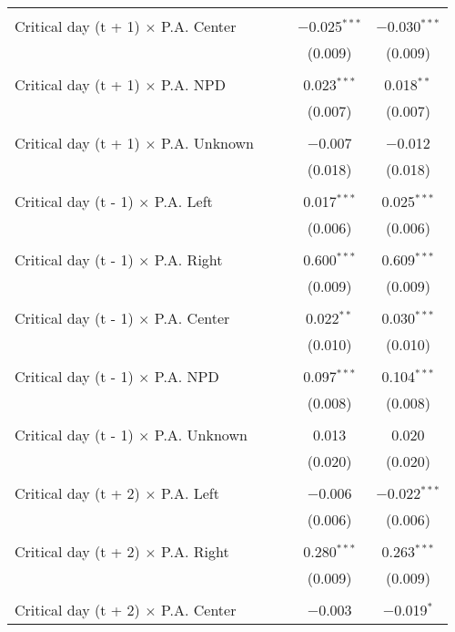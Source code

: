 \documentclass[
]{article}
\begin{document}
\begin{table}[!htbp]
{\begin{tabular}{@{\extracolsep{5pt}}lcccc}
  & & & & \\ 
 Critical day (t + 1) $\times$ P.A. Center &  &  & $-$0.025$^{***}$ & $-$0.030$^{***}$ \\ 
  &  &  & (0.009) & (0.009) \\ 
  & & & & \\ 
 Critical day (t + 1) $\times$ P.A. NPD &  &  & 0.023$^{***}$ & 0.018$^{**}$ \\ 
  &  &  & (0.007) & (0.007) \\ 
  & & & & \\ 
 Critical day (t + 1) $\times$ P.A. Unknown &  &  & $-$0.007 & $-$0.012 \\ 
  &  &  & (0.018) & (0.018) \\ 
  & & & & \\ 
 Critical day (t - 1) $\times$ P.A. Left &  &  & 0.017$^{***}$ & 0.025$^{***}$ \\ 
  &  &  & (0.006) & (0.006) \\ 
  & & & & \\ 
 Critical day (t - 1) $\times$ P.A. Right &  &  & 0.600$^{***}$ & 0.609$^{***}$ \\ 
  &  &  & (0.009) & (0.009) \\ 
  & & & & \\ 
 Critical day (t - 1) $\times$ P.A. Center &  &  & 0.022$^{**}$ & 0.030$^{***}$ \\ 
  &  &  & (0.010) & (0.010) \\ 
  & & & & \\ 
 Critical day (t - 1) $\times$ P.A. NPD &  &  & 0.097$^{***}$ & 0.104$^{***}$ \\ 
  &  &  & (0.008) & (0.008) \\ 
  & & & & \\ 
 Critical day (t - 1) $\times$ P.A. Unknown &  &  & 0.013 & 0.020 \\ 
  &  &  & (0.020) & (0.020) \\ 
  & & & & \\ 
 Critical day (t + 2) $\times$ P.A. Left &  &  & $-$0.006 & $-$0.022$^{***}$ \\ 
  &  &  & (0.006) & (0.006) \\ 
  & & & & \\ 
 Critical day (t + 2) $\times$ P.A. Right &  &  & 0.280$^{***}$ & 0.263$^{***}$ \\ 
  &  &  & (0.009) & (0.009) \\ 
  & & & & \\ 
 Critical day (t + 2) $\times$ P.A. Center &  &  & $-$0.003 & $-$0.019$^{*}$ \\ 

\end{tabular}}
\end{table}
\end{document}
